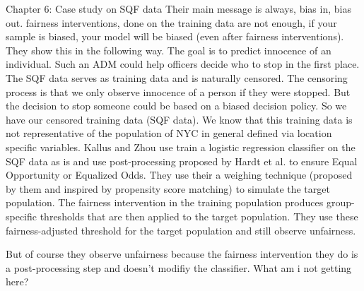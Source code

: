 Chapter 6: Case study on SQF data
Their main message is always, bias in, bias out. fairness interventions, done on the training data are not enough, if your sample is biased, your model will be biased (even after fairness interventions).
They show this in the following way. The goal is to predict innocence of an individual. Such an ADM could help officers
decide who to stop in the first place. The SQF data serves as training data and is naturally censored. The censoring process is that we only
observe innocence of a person if they were stopped. But the decision to stop someone could be based on a biased decision policy.
So we have our censored training data (SQF data). We know that this training data is not representative of the population of NYC in general defined via
location specific variables. Kallus and Zhou use train a logistic regression classifier on the SQF data as is and use post-processing proposed
by Hardt et al. to ensure Equal Opportunity or Equalized Odds. They use their a weighing technique (proposed by them and inspired by propensity score matching)
to simulate the target population. The fairness intervention in the training population produces group-specific thresholds that are then applied to the target population.
They use these fairness-adjusted threshold for the target population and still observe unfairness.

But of course they observe unfairness because the fairness intervention they do is a post-processing step and doesn't modifiy the classifier. What am i not getting here?